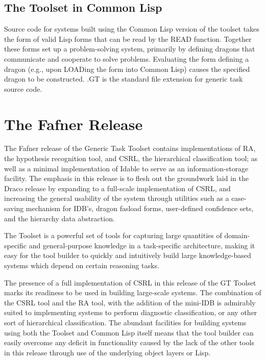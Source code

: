 
\section{The Toolset in Common Lisp}

Source code for systems built using the Common Lisp version of the
toolset takes the form of valid Lisp forms that can be read by the
READ function.  Together these forms set up a problem-solving system,
primarily by defining dragons that communicate and cooperate to
solve problems.  Evaluating the form defining a dragon (e.g., upon
LOADing the form into Common Lisp) causes the specified dragon to be
constructed.  .GT is the standard file extension for generic task
source code.



\chapter{The Fafner Release}


The Fafner release of the Generic Task Toolset contains
implementations of RA, the hypothesis recognition tool, and CSRL, the
hierarchical classification tool; as well as a minimal implementation
of Idable to serve as an information-storage facility. The emphasis in
this release is to flesh out the groundwork laid in the Draco release
by expanding to a full-scale implementation of CSRL, and increasing
the general usability of the system through utilities such as a
case-saving mechanism for IDB's, dragon fasload forms,
user-defined confidence sets, and the hierarchy data abstraction.

The Toolset is a powerful set of tools for capturing large quantities
of domain-specific and general-purpose knowledge in a task-specific
architecture, making it easy for the tool builder to quickly and
intuitively build large knowledge-based systems which depend on
certain reasoning tasks.

The presence of a full implementation of CSRL in this release of the
GT Toolset marks its readiness to be used in building large-scale
systems. The combination of the CSRL tool and the RA tool, with the
addition of the mini-IDB is admirably suited to implementing systems
to perform diagnostic classification, or any other sort of
hierarchical classification. The abundant facilities for building
systems using both the Toolset and Common Lisp itself means that the
tool builder can easily overcome any deficit in functionality caused
by the lack of the other tools in this release through use of the
underlying object layers or Lisp.

